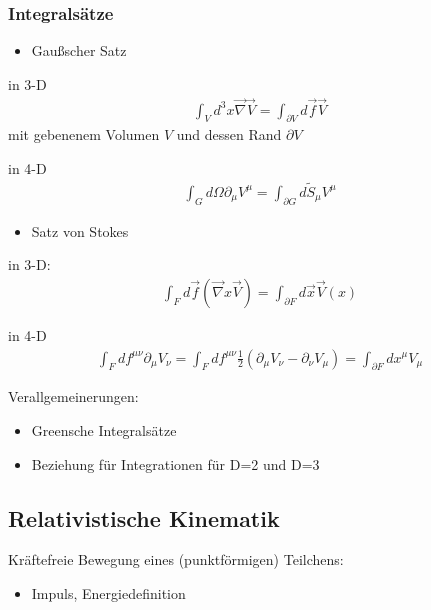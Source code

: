 \documentclass[a4paper]{article}
\begin{document}
\subsubsection{Integralsätze}
\begin{itemize}
  \item Gaußscher Satz
\end{itemize}
in 3-D
\begin{align}
\int_V d^3x \vec\nabla \vec{V} = \int_{\partial V} d\vec{f} \vec{V}
\end{align}
mit gebenenem Volumen $V$ und dessen Rand $\partial V$

in 4-D
\begin{align}
\int_G d\Omega \partial_\mu V^\mu = \int_{\partial G} d\tilde{S}_\mu V^\mu
\end{align}

\begin{itemize}
  \item Satz von Stokes
\end{itemize}

in 3-D:
\begin{align}
\int_F d\vec{f} (\vec{\nabla}x\vec{V}) = \int_{\partial F} d\vec{x} \vec{V}(x)
\end{align}

in 4-D
\begin{align}
\int_F df^{\mu\nu} \partial_\mu V_\nu= \int_F df^{\mu\nu}
\frac{1}{2}(\partial_\mu V_\nu-\partial_\nu V_\mu) = \int_{\partial F}
dx^\mu V_\mu
\end{align}

Verallgemeinerungen:\\
\begin{itemize}
  \item Greensche Integralsätze
  \item Beziehung für Integrationen für D=2 und D=3  
\end{itemize}

\subsection{Relativistische Kinematik}
Kräftefreie Bewegung eines (punktförmigen) Teilchens:
\begin{itemize}
  \item Impuls, Energiedefinition
\end{itemize}
\end{document}
